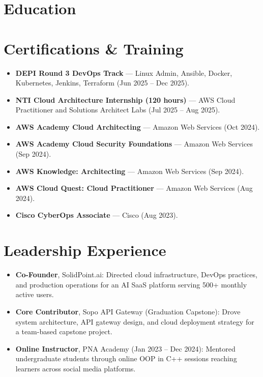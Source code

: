\documentclass{resume}
\begin{document}
\section{Education}

\section{Certifications \& Training}
\begin{itemize}
  \item \textbf{DEPI Round 3 DevOps Track} --- Linux Admin, Ansible, Docker, Kubernetes, Jenkins, Terraform (Jun 2025 -- Dec 2025).
  \item \textbf{NTI Cloud Architecture Internship (120 hours)} --- AWS Cloud Practitioner and Solutions Architect Labs (Jul 2025 -- Aug 2025).
  \item \textbf{AWS Academy Cloud Architecting} --- Amazon Web Services (Oct 2024).
  \item \textbf{AWS Academy Cloud Security Foundations} --- Amazon Web Services (Sep 2024).
  \item \textbf{AWS Knowledge: Architecting} --- Amazon Web Services (Sep 2024).
  \item \textbf{AWS Cloud Quest: Cloud Practitioner} --- Amazon Web Services (Aug 2024).
  \item \textbf{Cisco CyberOps Associate} --- Cisco (Aug 2023).
\end{itemize}

\section{Leadership Experience}
\begin{itemize}
  \item \textbf{Co-Founder}, SolidPoint.ai: Directed cloud infrastructure, DevOps practices, and production operations for an AI SaaS platform serving 500+ monthly active users.
  \item \textbf{Core Contributor}, Sopo API Gateway (Graduation Capstone): Drove system architecture, API gateway design, and cloud deployment strategy for a team-based capstone project.
  \item \textbf{Online Instructor}, PNA Academy (Jan 2023 -- Dec 2024): Mentored undergraduate students through online OOP in C++ sessions reaching learners across social media platforms.
\end{itemize}
\end{document}
